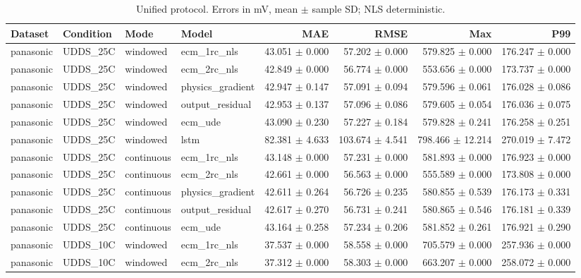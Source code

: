 \begin{longtable}{llllrrrr}
\caption{Unified protocol. Errors in mV, mean $\pm$ sample SD; NLS deterministic.}\\
Dataset & Condition & Mode & Model & MAE & RMSE & Max & P99 \\
\hline
panasonic & UDDS\_25C & windowed & ecm\_1rc\_nls & 43.051 $\pm$ 0.000 & 57.202 $\pm$ 0.000 & 579.825 $\pm$ 0.000 & 176.247 $\pm$ 0.000 \\
panasonic & UDDS\_25C & windowed & ecm\_2rc\_nls & 42.849 $\pm$ 0.000 & 56.774 $\pm$ 0.000 & 553.656 $\pm$ 0.000 & 173.737 $\pm$ 0.000 \\
panasonic & UDDS\_25C & windowed & physics\_gradient & 42.947 $\pm$ 0.147 & 57.091 $\pm$ 0.094 & 579.596 $\pm$ 0.061 & 176.028 $\pm$ 0.086 \\
panasonic & UDDS\_25C & windowed & output\_residual & 42.953 $\pm$ 0.137 & 57.096 $\pm$ 0.086 & 579.605 $\pm$ 0.054 & 176.036 $\pm$ 0.075 \\
panasonic & UDDS\_25C & windowed & ecm\_ude & 43.090 $\pm$ 0.230 & 57.227 $\pm$ 0.184 & 579.828 $\pm$ 0.241 & 176.258 $\pm$ 0.251 \\
panasonic & UDDS\_25C & windowed & lstm & 82.381 $\pm$ 4.633 & 103.674 $\pm$ 4.541 & 798.466 $\pm$ 12.214 & 270.019 $\pm$ 7.472 \\
panasonic & UDDS\_25C & continuous & ecm\_1rc\_nls & 43.148 $\pm$ 0.000 & 57.231 $\pm$ 0.000 & 581.893 $\pm$ 0.000 & 176.923 $\pm$ 0.000 \\
panasonic & UDDS\_25C & continuous & ecm\_2rc\_nls & 42.661 $\pm$ 0.000 & 56.563 $\pm$ 0.000 & 555.589 $\pm$ 0.000 & 173.808 $\pm$ 0.000 \\
panasonic & UDDS\_25C & continuous & physics\_gradient & 42.611 $\pm$ 0.264 & 56.726 $\pm$ 0.235 & 580.855 $\pm$ 0.539 & 176.173 $\pm$ 0.331 \\
panasonic & UDDS\_25C & continuous & output\_residual & 42.617 $\pm$ 0.270 & 56.731 $\pm$ 0.241 & 580.865 $\pm$ 0.546 & 176.181 $\pm$ 0.339 \\
panasonic & UDDS\_25C & continuous & ecm\_ude & 43.164 $\pm$ 0.258 & 57.234 $\pm$ 0.206 & 581.852 $\pm$ 0.261 & 176.921 $\pm$ 0.290 \\
panasonic & UDDS\_10C & windowed & ecm\_1rc\_nls & 37.537 $\pm$ 0.000 & 58.558 $\pm$ 0.000 & 705.579 $\pm$ 0.000 & 257.936 $\pm$ 0.000 \\
panasonic & UDDS\_10C & windowed & ecm\_2rc\_nls & 37.312 $\pm$ 0.000 & 58.303 $\pm$ 0.000 & 663.207 $\pm$ 0.000 & 258.072 $\pm$ 0.000 \\

\end{longtable}
